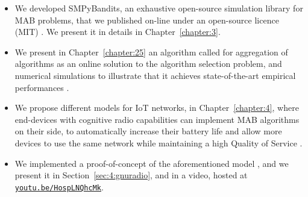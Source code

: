 \begin{itemize}


    \item
    We developed SMPyBandits, an exhaustive open-source simulation library for MAB problems, that we published on-line under an open-source licence (MIT) \cite{SMPyBanditsJMLR,SMPyBandits}.
    We present it in details in Chapter~\ref{chapter:3}.

    \item
    We present in Chapter~\ref{chapter:25} an algorithm called \Aggr{} for aggregation of algorithms as an online solution to the algorithm selection problem, and numerical simulations to illustrate that it achieves state-of-the-art empirical performances
    \cite{Besson2018WCNC}.

    \item
    We propose different models for IoT networks, in Chapter~\ref{chapter:4}, where end-devices with cognitive radio capabilities can implement MAB algorithms on their side, to automatically increase their battery life and allow more devices to use the same network while maintaining a high Quality of Service
    \cite{Bonnefoi17,Besson2019WCNC,Bonnefoi2019WCNC,MoyBesson2019,MoyBesson2019Annales}.

    \item
    We implemented a proof-of-concept of the aforementioned model \cite{Besson2018ICT}, and we present it in Section~\ref{sec:4:gnuradio},
    and in a video, hosted at
    \texttt{\href{https://youtu.be/HospLNQhcMk}{youtu.be/HospLNQhcMk}}.


\end{itemize}
